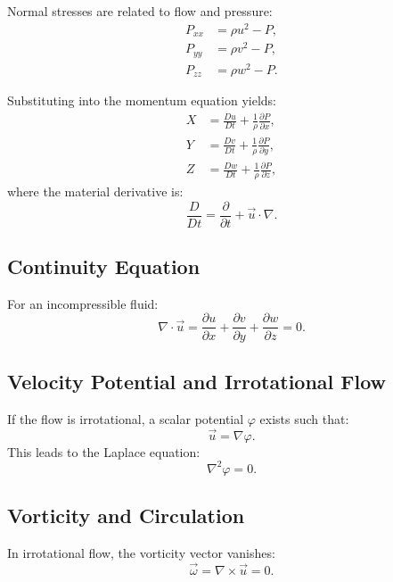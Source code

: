 \documentclass[a4paper,12pt]{article}
\begin{document}
    Normal stresses are related to flow and pressure:
    \begin{align}
        P_{xx} &= \rho u^2 - P, \\
        P_{yy} &= \rho v^2 - P, \\
        P_{zz} &= \rho w^2 - P.
    \end{align}

    Substituting into the momentum equation yields:
    \begin{align}
        X &= \frac{D u}{D t} + \frac{1}{\rho} \frac{\partial P}{\partial x}, \\
        Y &= \frac{D v}{D t} + \frac{1}{\rho} \frac{\partial P}{\partial y}, \\
        Z &= \frac{D w}{D t} + \frac{1}{\rho} \frac{\partial P}{\partial z},
    \end{align}
    where the material derivative is:
    \begin{equation}
        \frac{D}{D t} = \frac{\partial}{\partial t} + \vec{u} \cdot \nabla.
    \end{equation}

    \subsection{Continuity Equation}
    For an incompressible fluid:
    \begin{equation}
        \nabla \cdot \vec{u} = \frac{\partial u}{\partial x} + \frac{\partial v}{\partial y} + \frac{\partial w}{\partial z} = 0.
    \end{equation}

    \subsection*{Velocity Potential and Irrotational Flow}
    If the flow is irrotational, a scalar potential \(\varphi\) exists such that:
    \begin{equation}
        \vec{u} = \nabla \varphi.
    \end{equation}
    This leads to the Laplace equation:
    \begin{equation}
        \nabla^2 \varphi = 0.
    \end{equation}

    \subsection{Vorticity and Circulation}
    In irrotational flow, the vorticity vector vanishes:
    \begin{equation}
        \vec{\omega} = \nabla \times \vec{u} = 0.
    \end{equation}
\end{document}
